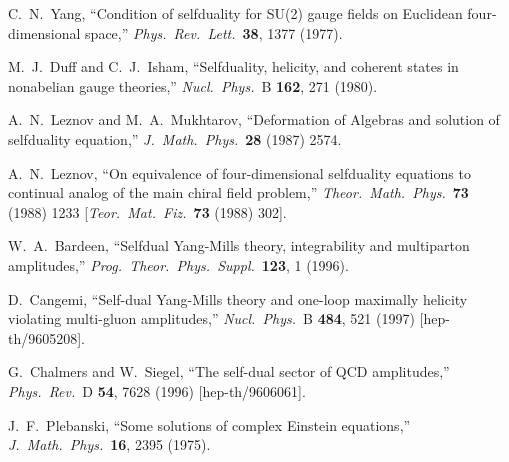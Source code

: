 \documentclass[12pt]{livrev}
\begin{document}
\begin{thebibliography}{99}
C.~N.~Yang,
``Condition of selfduality for SU(2) gauge fields on 
Euclidean four-dimensional space,''
{\it Phys.\ Rev.\ Lett.}\  {\bf 38}, 1377 (1977).

M.~J.~Duff and C.~J.~Isham,
``Selfduality, helicity, and coherent states in nonabelian gauge theories,''
{\it Nucl.\ Phys.}\ B {\bf 162}, 271 (1980).

A.~N.~Leznov and M.~A.~Mukhtarov,
``Deformation of Algebras and solution of selfduality equation,''
{\it J.\ Math.\ Phys.}\  {\bf 28} (1987) 2574.

A.~N.~Leznov,
``On equivalence of four-dimensional selfduality equations to continual 
analog of the main chiral field problem,''
{\it Theor.\ Math.\ Phys.}\  {\bf 73} (1988) 1233
[{\it Teor.\ Mat.\ Fiz.}\  {\bf 73} (1988) 302].

W.~A.~Bardeen,
``Selfdual Yang-Mills theory, integrability and multiparton amplitudes,''
{\it Prog.\ Theor.\ Phys.\ Suppl.}\  {\bf 123}, 1 (1996).

D.~Cangemi,
``Self-dual Yang-Mills theory and one-loop maximally helicity violating  
multi-gluon amplitudes,''
{\it Nucl.\ Phys.}\ B {\bf 484}, 521 (1997)
[hep-th/9605208].

G.~Chalmers and W.~Siegel,
``The self-dual sector of {QCD} amplitudes,''
{\it Phys.\ Rev.}\ D {\bf 54}, 7628 (1996)
[hep-th/9606061].

J.~F.~Plebanski,
``Some solutions of complex Einstein equations,''
{\it J.\ Math.\ Phys.}\  {\bf 16}, 2395 (1975).


\end{thebibliography}
\end{document}
